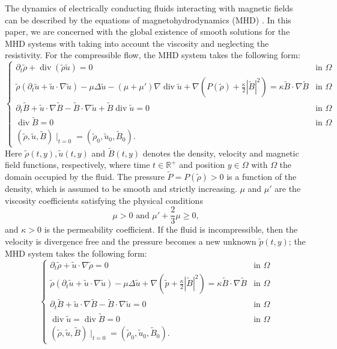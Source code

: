 \documentclass[a4paper,reqno,11pt]{amsart}
\numberwithin{equation}{section}
\begin{document}
The dynamics of electrically conducting fluids interacting with magnetic fields can be described by the equations of magnetohydrodynamics (MHD) \cite{Ca,Co,LL}. In this paper, we are concerned with the global existence of smooth solutions for the MHD systems with taking into account the viscosity and neglecting the resistivity. For the compressible flow, the MHD system takes the following form:
\begin{equation}\label{ns_euler0c}
\begin{cases}
 {\partial_t} \tilde{\rho} +\operatorname{div}( \tilde{\rho}\tilde{u})=0& \text{in } \Omega\\
\tilde {\rho}   (\partial_t\tilde{u}  +   \tilde{u}\cdot \nabla \tilde{u} ) -\mu\Delta \tilde{u}-(\mu+\mu')\nabla\operatorname{div} \tilde u+\nabla \left(    P (\tilde{\rho} )+\frac{\kappa}{2}|\tilde{B}|^2 \right) =\kappa\tilde{B} \cdot \nabla \tilde{B}  & \text{in } \Omega
\\ \partial_t\tilde{B}  +   \tilde{u} \cdot \nabla \tilde{B}  -\tilde{B} \cdot \nabla \tilde{u}+\tilde{B} \operatorname{div} \tilde u=0 & \text{in } \Omega
\\\operatorname{div}{\tilde B}=0 &\text{in }\Omega
\\ (\tilde{\rho},\tilde u,   \tilde B)\mid_{t=0}=(\tilde{\rho}_0,\tilde u_0,  \tilde B_0).
\end{cases}
\end{equation}
 Here $\tilde{\rho}(t,y), \tilde u(t,y) $ and $\tilde B(t,y)$ denotes the density, velocity and magnetic field functions, respectively, where time $t\in \mathbb{R}^+$ and position $y\in \Omega$  with $\Omega$ the domain occupied by the fluid.
The pressure $\tilde P  =  P (\tilde{\rho} )>0$ is a function of the density, which is assumed to be smooth and strictly increasing. $\mu $  and  $\mu' $ are the viscosity coefficients satisfying the physical conditions
\begin{equation}\label{visco}
 \mu>0 \text{ and }\mu'+ \frac{2}{3}\mu\ge 0,
\end{equation}
and $\kappa>0$ is the permeability coefficient. If the fluid is incompressible, then the velocity is divergence free and the pressure becomes a new unknown $\tilde p(t,y)$; the MHD system takes the following form:
\begin{equation}\label{ns_euler0ic}
\begin{cases}
 {\partial_t} \tilde{\rho} +\tilde{u}\cdot\nabla\tilde{\rho}=0& \text{in } \Omega\\
\tilde {\rho}   (\partial_t\tilde{u}  +   \tilde{u}\cdot \nabla \tilde{u} ) -\mu\Delta \tilde{u}+\nabla \left(\tilde p+\frac{\kappa}{2}|\tilde{B}|^2 \right) =\kappa\tilde{B} \cdot \nabla \tilde{B} & \text{in } \Omega
\\ \partial_t\tilde{B}  +   \tilde{u} \cdot \nabla \tilde{B} -\tilde{B} \cdot \nabla \tilde{u}=0 & \text{in } \Omega
\\\operatorname{div}{\tilde u}=\operatorname{div}{\tilde B}=0 &\text{in }\Omega
\\ (\tilde{\rho},\tilde u,   \tilde B)\mid_{t=0}=(\tilde{\rho}_0,\tilde u_0,  \tilde B_0).
\end{cases}
\end{equation}
\end{document}
